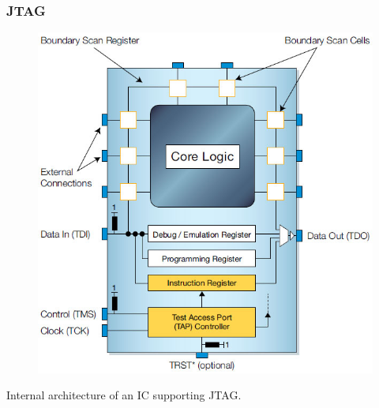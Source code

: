 \documentclass[t]{beamer}
\begin{document}

\begin{frame}[t]
\frametitle{JTAG}
\begin{figure}
	\includegraphics[width=0.5\linewidth]{jtagInternals.jpg}
\end{figure}
Internal architecture of an IC supporting JTAG.
\end{frame}

\end{document}
